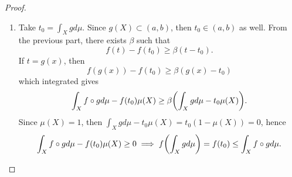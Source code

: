 \documentclass[hw_all.tex]{subfiles}
\begin{document}
\begin{proof}
\begin{enumerate}
        \item 
            Take $t_0 = \int_X g d \mu$. Since $g(X) \subset (a,b)$, then $t_0 \in (a,b)$ as well. From the previous part, there exists $\beta$ such that
            \[
                f(t) - f(t_0) \geq \beta (t-t_0)
            .\]
            If $t = g(x)$, then
            \[
                f(g(x)) - f(t_0) \geq \beta(g(x) - t_0)
            \]
            which integrated gives
            \[
                \int_X f \circ g d \mu - f(t_0) \mu(X) \geq \beta \qty(\int_X g d \mu - t_0 \mu(X))
            .\]
            Since $\mu(X) = 1$, then $\int_X g d \mu - t_0 \mu(X) = t_0 (1 - \mu(X)) = 0$, hence
            \[
                \int_X f \circ g d \mu - f(t_0) \mu(X) \geq 0 \implies f\qty(\int_X g d \mu) = f(t_0) \leq \int_X f \circ g d \mu
            .\]
    \end{enumerate}
\end{proof}
\end{document}
